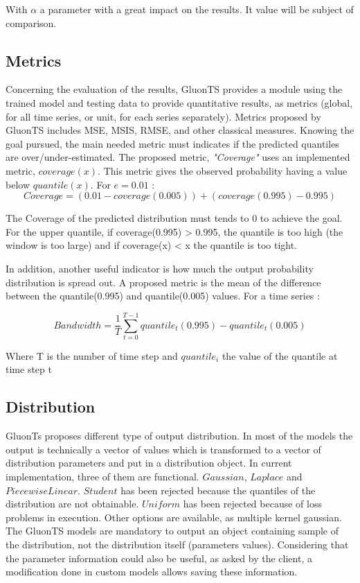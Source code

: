 \documentclass[a4paper, 12pt]{article}
\begin{document}
With $\alpha$ a parameter with a great impact on the results. It value will be subject of comparison.

  
  
\subsection{Metrics} \label{metrics}

Concerning the evaluation of the results, GluonTS provides a module using the trained model and testing data to provide quantitative results, as metrics (global, for all time series, or unit, for each series separately). Metrics proposed by GluonTS includes MSE, MSIS, RMSE, and other classical measures.
Knowing the goal pursued, the main needed metric must indicates if the predicted quantiles are over/under-estimated. 
The proposed 
metric, \textit{"Coverage"} uses an implemented metric, $coverage(x)$.
This metric gives the observed probability having a value below $quantile(x)$.
For $e=0.01$ :  
\begin{equation}
    Coverage = (0.01 - coverage(0.005)) + (coverage(0.995) - 0.995) 
\end{equation}

The Coverage of the predicted distribution must tends to 0 to achieve the goal. For the upper quantile,
if coverage(0.995) > 0.995, the quantile is too high (the window is too large) and
if coverage(x) < x the quantile is too tight.


In addition, another useful indicator is how much the output probability distribution is spread out. 
A proposed metric is  the mean of the difference between 
the quantile(0.995) and quantile(0.005) values. For a time series :

\begin{equation}
    Bandwidth = \frac{1}{T}  \sum_{t=0}^{T-1} quantile_{t}(0.995) - quantile_{t}(0.005) 
\end{equation}


Where T is the number of time step and $quantile_{i}$ the value of the quantile at time step t


\subsection{Distribution}

GluonTs proposes different type of output distribution. In most of the models the output is technically
 a vector of values which is
transformed to a vector of distribution parameters  and put in a distribution object.
In current implementation, three of them are functional. $Gaussian$, $Laplace$ and $PiecewiseLinear$.
$Student$ has been rejected because the quantiles of the distribution are not obtainable.
$Uniform$ has been rejected because of loss problems in execution.
Other options are available, as multiple kernel gaussian.
The GluonTS models are mandatory to output an object containing sample of the distribution, not the distribution itself (parameters values). Considering that the parameter information could also be useful, as asked by the client, a modification done in custom models allows saving these information.
\end{document}
